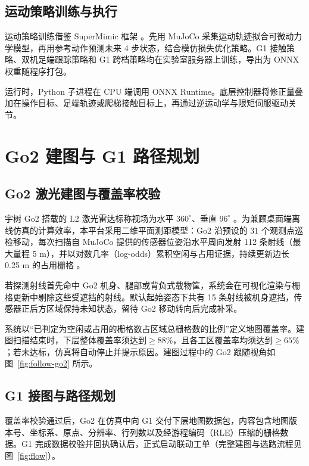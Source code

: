 \documentclass[10pt,a4paper,UTF8,fontset=fandol]{ctexart}
\begin{document}
\subsection{运动策略训练与执行}

运动策略训练借鉴 SuperMimic 框架 \cite{liao2026supermimic}。先用 MuJoCo 采集运动轨迹拟合可微动力学模型，再用参考动作预测未来 4 步状态，结合模仿损失优化策略。G1 接触策略、双机足端跟踪策略和 G1 跨档策略均在实验室服务器上训练，导出为 ONNX 权重随程序打包。

运行时，Python 子进程在 CPU 端调用 ONNX Runtime。底层控制器将修正量叠加在操作目标、足端轨迹或爬梯接触目标上，再通过逆运动学与限矩伺服驱动关节。

\clearpage

\section{Go2 建图与 G1 路径规划}

\subsection{Go2 激光建图与覆盖率校验}

宇树 Go2 搭载的 L2 激光雷达标称视场为水平 \(360^\circ\)、垂直 \(96^\circ\) \cite{unitreeGo2}。为兼顾桌面端离线仿真的计算效率，本平台采用二维平面测距模型：Go2 沿预设的 31 个观测点巡检移动，每次扫描自 MuJoCo 提供的传感器位姿沿水平周向发射 112 条射线（最大量程 5 m），并以对数几率（log-odds）累积空闲与占用证据，持续更新边长 0.25 m 的占用栅格 \cite{elfes1989occupancy}。

若探测射线首先命中 Go2 机身、腿部或背负式载物筐，系统会在可视化渲染与栅格更新中剔除这些受遮挡的射线。默认起始姿态下共有 15 条射线被机身遮挡，传感器正后方区域保持未知状态，留待 Go2 移动转向后完成补采。

系统以“已判定为空闲或占用的栅格数占区域总栅格数的比例”定义地图覆盖率。建图扫描结束时，下层整体覆盖率须达到\(\ge 88\%\)，且各工区覆盖率均须达到\(\ge 65\%\)；若未达标，仿真将自动停止并提示原因。建图过程中的 Go2 跟随视角如图~\ref{fig:follow-go2} 所示。

\subsection{G1 接图与路径规划}

覆盖率校验通过后，Go2 在仿真中向 G1 交付下层地图数据包，内容包含地图版本号、坐标系、原点、分辨率、行列数以及经游程编码（RLE）压缩的栅格数据。G1 完成数据校验并回执确认后，正式启动联动工单（完整建图与选路流程见图~\ref{fig:flow}）。
\end{document}
